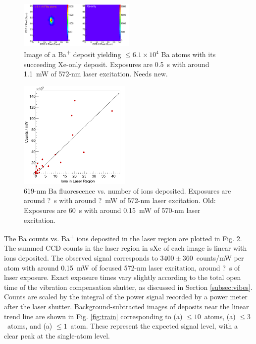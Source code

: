 \documentclass[aps,pra,reprint,superscriptaddress]{revtex4-1}
\begin{document}
\begin{figure}
\includegraphics[width=0.5\textwidth]{figures/xebaxe_largest_instantaneous.png}
\caption{Image of a Ba\textsuperscript{+} deposit yielding $\leq 6.1 \times 10^4$ Ba atoms with its succeeding Xe-only deposit.  Exposures are 0.5~s with around 1.1~mW of 572-nm laser excitation. {\color{gray}Needs new.}}
\label{fig:XeBaXeLarge}
\end{figure}

\begin{figure}
\includegraphics[width=0.48\textwidth]{figures/lin_just20150807_lin.png}
\caption{619-nm Ba fluorescence vs. number of ions deposited.  Exposures are around {\color{gray}?}~s with around {\color{gray}?}~mW of 572-nm laser excitation. {\color{gray}Old: Exposures are 60~s with around 0.15~mW of 570-nm laser excitation.}}
\label{fig:ctsVsIons}
\end{figure}

The Ba counts vs. Ba\textsuperscript{+} ions deposited in the laser region are plotted in Fig. \ref{fig:ctsVsIons}.  The summed CCD counts in the laser region in sXe of each image is linear with ions deposited.  The observed signal corresponds to {\color{gray}$3400 \pm 360$}~counts/mW per atom with around {\color{gray}0.15~mW} of focused 572-nm laser excitation, around {\color{gray}?}~s of laser exposure.  Exact exposure times vary slightly according to the total open time of the vibration compensation shutter, as discussed in Section \ref{subsec:vibes}.  Counts are scaled by the integral of the power signal recorded by a power meter after the laser shutter.  Background-subtracted images of deposits near the linear trend line are shown in Fig. \ref{fig:train} corresponding to {\color{gray}(a) $\leq 10$~atoms, (a) $\leq 3$~atoms, and (a) $\leq 1$~atom}.  These represent the expected signal level, with a clear peak at the single-atom level.
\end{document}
